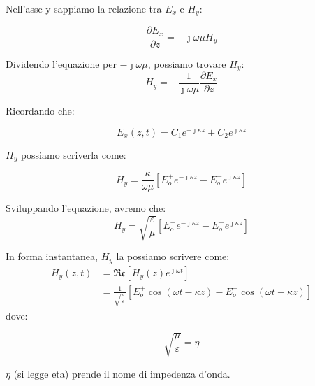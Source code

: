 Nell'asse y sappiamo la relazione tra $E_x$ e $H_y$:  

{
    \Large
    \begin{equation}
    \frac{\partial E_x}{\partial z} = -\jmath \omega \mu H_y     
    \end{equation}
}

Dividendo l'equazione per $-\jmath \omega \mu$, possiamo trovare $H_y$: 
{
    \Large
    \begin{equation}
   H_y = - \frac{1}{\jmath \omega \mu} \frac{\partial E_x}{\partial z }     
    \end{equation}
}

Ricordando che: 

{
    \Large
    \begin{equation}
   E_x (z,t) = C_1 e^{-\jmath \kappa z} + C_2 e^{\jmath \kappa z}     
    \end{equation}
}


$H_y$ possiamo scriverla come: 

{
    \Large
    \begin{equation}
   H_y = \frac{\kappa}{\omega \mu} [E_o ^+ e^{-\jmath \kappa z} - E_o ^- e^{\jmath \kappa z}]     
    \end{equation}
}

Sviluppando l'equazione, avremo che: 
{
    \Large 
    \begin{equation}
   H_y = \sqrt{\frac{\varepsilon}{\mu}} [E_o ^+ e^{-\jmath \kappa z} - E_o ^- e^{\jmath \kappa z}]      
    \end{equation}
}


In forma instantanea, $H_y$ la possiamo scrivere come: \\ 

{
    \Large
    \begin{equation} 
        \begin{split}
            H_y (z, t) 
            &= \mathfrak{Re}[H_y(z) e^{\jmath \omega t}] 
            \\
            &= \frac{1}{\sqrt{\frac{\mu}{\varepsilon}}}[E_o^+ \cos(\omega t - \kappa z) - E_o^- \cos(\omega t + \kappa z)]  
        \end{split}
    \end{equation}
}
dove: 

{
    \Large
    \begin{equation}
        \sqrt{\frac{\mu}{\varepsilon}} = \eta     
    \end{equation}
}

$\eta$ (si legge eta) prende il nome di impedenza d'onda. \\ \\ 

